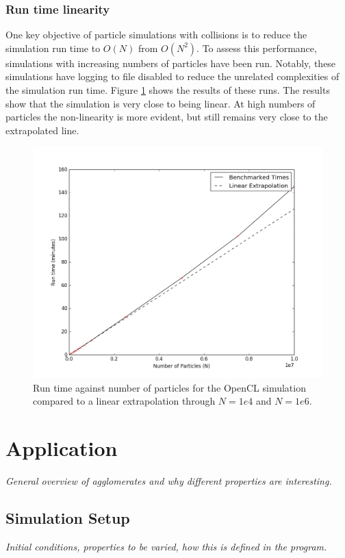 \documentclass[10pt,a4paper,titlepage]{report}
\begin{document}
\subsection{Run time linearity}
One key objective of particle simulations with collisions is to reduce the simulation run time to $O(N)$ from $O(N^2)$. To assess this performance, simulations with increasing numbers of particles have been run. Notably, these simulations have logging to file disabled to reduce the unrelated complexities of the simulation run time. Figure \ref{fig:opencl_performance} shows the results of these runs. The results show that the simulation is very close to being linear. At high numbers of particles the non-linearity is more evident, but still remains very close to the extrapolated line.
\begin{figure}[!htb]
\centering
\includegraphics[scale=0.7]{figures/opencl_performance.png}
\caption{Run time against number of particles for the OpenCL simulation compared to a linear extrapolation through $N=1e4$ and $N=1e6$.}
\label{fig:opencl_performance}
\end{figure}
\chapter{Application}
\label{ch:Application}
\textit{General overview of agglomerates and why different properties are interesting.}
\section{Simulation Setup}
\textit{Initial conditions, properties to be varied, how this is defined in the program.}
\end{document}
